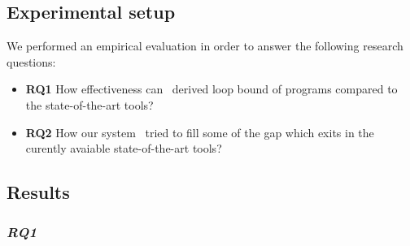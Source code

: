 \subsection{Experimental setup}


We performed an empirical evaluation in order to answer the following research questions:

\begin{itemize} 
	
	\item \textbf{RQ1} How effectiveness can \SystemName\ derived loop bound of programs compared to the state-of-the-art tools? 
	\item \textbf{RQ2} How our system \SystemName\ tried to fill some of the gap which exits in the curently avaiable state-of-the-art tools?
\end{itemize}



\subsection{Results}




\subsubsection{\textbf{\textit{RQ1}}} 

